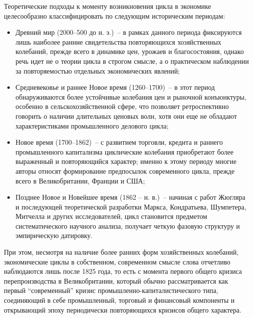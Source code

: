 Теоретические подходы к моменту возникновения цикла в экономике целесообразно классифицировать по следующим историческим периодам:
\begin{itemize}
    \item Древний мир (2000–500 до н. э.) – в рамках данного периода фиксируются лишь наиболее ранние свидетельства повторяющихся хозяйственных колебаний, прежде всего в динамике цен, урожаев и благосостояния, однако речь идет не о теории цикла в строгом смысле, а о практическом наблюдении за повторяемостью отдельных экономических явлений;
    \item Средневековье и раннее Новое время (1260–1700) – в этот период обнаруживаются более устойчивые колебания цен и рыночной конъюнктуры, особенно в сельскохозяйственной сфере, что позволяет ретроспективно говорить о наличии длительных ценовых волн, хотя они еще не обладают характеристиками промышленного делового цикла;
    \item Новое время (1700–1862) – с развитием торговли, кредита и раннего промышленного капитализма циклические колебания приобретают более выраженный и повторяющийся характер; именно к этому периоду многие авторы относят формирование предпосылок современного цикла, прежде всего в Великобритании, Франции и США;
    \item Позднее Новое и Новейшее время (1862 – н. в.) – начиная с работ Жюгляра и последующей теоретической разработки Маркса, Кондратьева, Шумпетера, Митчелла и других исследователей, цикл становится предметом систематического научного анализа, получает четкую фазовую структуру и эмпирическую датировку.
\end{itemize}

При этом, несмотря на наличие более ранних форм хозяйственных колебаний, экономические циклы в собственном, современном смысле слова отчетливо наблюдаются лишь после 1825 года, то есть с момента первого общего кризиса перепроизводства в Великобритании, который обычно рассматривается как первый ``современный'' кризис промышленно-капиталистического типа, соединяющий в себе промышленный, торговый и финансовый компоненты и открывающий эпоху периодически повторяющихся кризисов общего характера.

